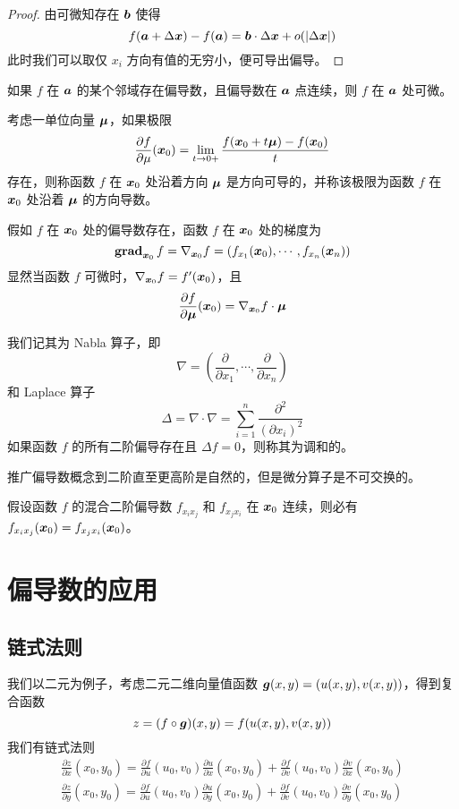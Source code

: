 \begin{proof}
	由可微知存在 $\boldsymbol{b}$ 使得
	\[ f(\boldsymbol{a} + \Delta \boldsymbol{x}) - f(\boldsymbol{a}) = \boldsymbol{b} \cdot \Delta \boldsymbol{x} + o(|\Delta \boldsymbol{x}|) \]
	此时我们可以取仅 $x_i$ 方向有值的无穷小，便可导出偏导。
\end{proof}

\begin{theorem}
	如果 $f$ 在 $\boldsymbol{a}$ 的某个邻域存在偏导数，且偏导数在 $\boldsymbol{a}$ 点连续，则 $f$ 在 $\boldsymbol{a}$ 处可微。
\end{theorem}

考虑一单位向量 $\boldsymbol{\mu}$，如果极限
\[ \frac{\partial f}{\partial \mu}(\boldsymbol{x}_0) = \lim_{t \to 0+} \frac{f(\boldsymbol{x}_0 + t \boldsymbol{\mu}) - f(\boldsymbol{x}_0)}{t} \]
存在，则称函数 $f$ 在 $\boldsymbol{x}_0$ 处沿着方向 $\boldsymbol{\mu}$ 是方向可导的，并称该极限为函数 $f$ 在 $\boldsymbol{x}_0$ 处沿着 $\boldsymbol{\mu}$ 的方向导数。

假如 $f$ 在 $\boldsymbol{x}_0$ 处的偏导数存在，函数 $f$ 在 $\boldsymbol{x}_0$ 处的梯度为
\[ \operatorname{\mathbf{grad}}_{\boldsymbol{x}_0} f = \nabla_{\boldsymbol{x}_0} f = \left( f_{x_1}(\boldsymbol{x}_0), \cdots, f_{x_n}(\boldsymbol{x}_n) \right) \]
显然当函数 $f$ 可微时，$\nabla_{\boldsymbol{x}_0} f = f'(\boldsymbol{x}_0)$，且
\[ \frac{\partial f}{\partial \boldsymbol{\mu}} (\boldsymbol{x}_0) = \nabla_{\boldsymbol{x}_0} f \cdot \boldsymbol{\mu} \]

我们记其为 Nabla 算子，即
\[ \nabla = \left( \frac{\partial}{\partial x_1}, \cdots, \frac{\partial}{\partial x_n} \right) \]
和 Laplace 算子
\[ \Delta = \nabla \cdot \nabla = \sum_{i=1}^{n} \frac{\partial^2}{(\partial x_i)^2} \]
如果函数 $f$ 的所有二阶偏导存在且 $\Delta f = 0$，则称其为调和的。

推广偏导数概念到二阶直至更高阶是自然的，但是微分算子是不可交换的。

\begin{theorem}
	假设函数 $f$ 的混合二阶偏导数 $f_{x_i x_j}$ 和 $f_{x_j x_i}$ 在 $\boldsymbol{x}_0$ 连续，则必有 $f_{x_i x_j}(\boldsymbol{x}_0) = f_{x_j x_i}(\boldsymbol{x}_0)$。
\end{theorem}

\section{偏导数的应用}

\subsection{链式法则}

我们以二元为例子，考虑二元二维向量值函数 $\boldsymbol{g}(x, y) = (u(x, y), v(x, y))$，得到复合函数
\[ z = (f \circ \boldsymbol{g})(x, y) = f(u(x, y), v(x, y)) \]
我们有链式法则
\[ \begin{aligned}
		\frac{\partial z}{\partial x}(x_0, y_0) = \frac{\partial f}{\partial u}(u_0, v_0) \frac{\partial u}{\partial x}(x_0, y_0) + \frac{\partial f}{\partial v}(u_0, v_0)\frac{\partial v}{\partial x}(x_0, y_0) \\
		\frac{\partial z}{\partial y}(x_0, y_0) = \frac{\partial f}{\partial u}(u_0, v_0) \frac{\partial u}{\partial y}(x_0, y_0) + \frac{\partial f}{\partial v}(u_0, v_0)\frac{\partial v}{\partial y}(x_0, y_0)
	\end{aligned} \]

